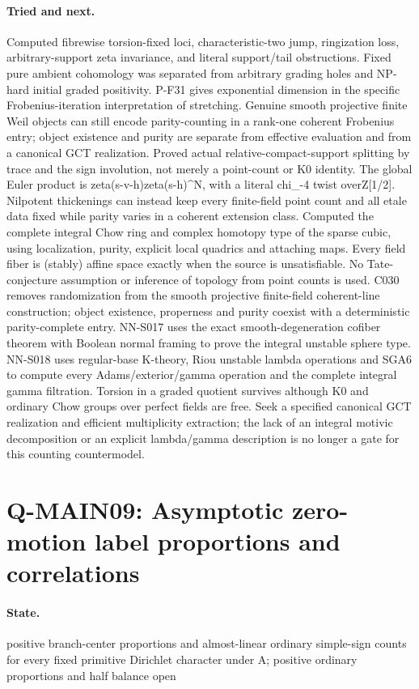 \paragraph{Tried and next.} Computed fibrewise torsion-fixed loci, characteristic-two jump, ringization loss, arbitrary-support zeta invariance, and literal support/tail obstructions. Fixed pure ambient cohomology was separated from arbitrary grading holes and NP-hard initial graded positivity. P-F31 gives exponential dimension in the specific Frobenius-iteration interpretation of stretching. Genuine smooth projective finite Weil objects can still encode parity-counting in a rank-one coherent Frobenius entry; object existence and purity are separate from effective evaluation and from a canonical GCT realization. Proved actual relative-compact-support splitting by trace and the sign involution, not merely a point-count or K0 identity. The global Euler product is zeta(s-v-h)zeta(s-h)\textasciicircum{}N, with a literal chi\_-4 twist overZ[1/2]. Nilpotent thickenings can instead keep every finite-field point count and all etale data fixed while parity varies in a coherent extension class. Computed the complete integral Chow ring and complex homotopy type of the sparse cubic, using localization, purity, explicit local quadrics and attaching maps. Every field fiber is (stably) affine space exactly when the source is unsatisfiable. No Tate-conjecture assumption or inference of topology from point counts is used. C030 removes randomization from the smooth projective finite-field coherent-line construction; object existence, properness and purity coexist with a deterministic parity-complete entry. NN-S017 uses the exact smooth-degeneration cofiber theorem with Boolean normal framing to prove the integral unstable sphere type. NN-S018 uses regular-base K-theory, Riou unstable lambda operations and SGA6 to compute every Adams/exterior/gamma operation and the complete integral gamma filtration. Torsion in a graded quotient survives although K0 and ordinary Chow groups over perfect fields are free. Seek a specified canonical GCT realization and efficient multiplicity extraction; the lack of an integral motivic decomposition or an explicit lambda/gamma description is no longer a gate for this counting countermodel.

\section{Q-MAIN09: Asymptotic zero-motion label proportions and correlations}
\paragraph{State.} positive branch-center proportions and almost-linear ordinary simple-sign counts for every fixed primitive Dirichlet character under A; positive ordinary proportions and half balance open
